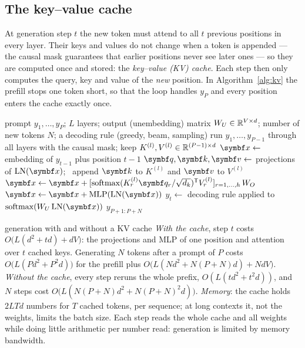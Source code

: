 \documentclass[11pt]{article}
\newcommand{\qv}{\vect{q}}
\newcommand{\kv}{\vect{k}}
\newcommand{\vv}{\vect{v}}
\newcommand{\softmax}{\operatorname{softmax}}
\newcommand{\LN}{\operatorname{LN}}
\newcommand{\MLP}{\operatorname{MLP}}
\begin{document}
\subsection{The key--value cache}\label{sec:kvcache}

At generation step $t$ the new token must attend to all $t$ previous positions in every layer. Their keys and values do not
change when a token is appended --- the causal mask guarantees that earlier positions never see later ones --- so they are
computed once and stored: the \emph{key--value (KV) cache}. Each step then only computes the query, key and value of the
\emph{new} position. In Algorithm~\ref{alg:kv} the prefill stops one token short, so that the loop handles $y_P$ and
every position enters the cache exactly once.

\begin{algorithm}[htbp]
\caption{Autoregressive generation with a key--value cache (decoder-only model)}\label{alg:kv}
\begin{algorithmic}[1]
\Require prompt $y_1, \dots, y_P$; $L$ layers; output (unembedding) matrix $W_U \in \mathbb{R}^{V \times d}$; number of new tokens
  $N$; a decoding rule (greedy, beam, sampling)
  \State run $y_1, \dots, y_{P-1}$ through all layers with the causal mask; keep $K^{(l)}, V^{(l)} \in \mathbb{R}^{(P-1) \times d}$
    \State $\x \gets$ embedding of $y_{t-1}$ plus position $t - 1$ 
      \State $\qv, \kv, \vv \gets$ projections of $\LN(\x)$; \ append $\kv$ to $K^{(l)}$ and $\vv$ to $V^{(l)}$ 
      \State $\x \gets \x + [\softmax(K^{(l)}_r\qv_r/\sqrt{d_k})\T V^{(l)}_r]_{r = 1, \dots, h}\,W_O$ 
      \State $\x \gets \x + \MLP(\LN(\x))$ 
    \EndFor
    \State $y_t \gets$ decoding rule applied to $\softmax(W_U\LN(\x))$ 
  \EndFor
  \State \Return $y_{P+1:P+N}$
\EndFunction
\end{algorithmic}
\end{algorithm}

\begin{runtime}{generation with and without a KV cache}
\emph{With the cache}, step $t$ costs $O\big(L(d^2 + td) + dV\big)$: the projections and MLP of one position and attention over
$t$ cached keys. Generating $N$ tokens after a prompt of $P$ costs $O\big(L(Pd^2 + P^2d)\big)$ for the prefill plus
$O\big(L(Nd^2 + N(P + N)d) + NdV\big)$. \emph{Without the cache}, every step reruns the whole prefix, $O(L(td^2 + t^2d))$,
and $N$ steps cost $O\big(L(N(P + N)d^2 + N(P + N)^2d)\big)$. \emph{Memory}: the cache holds $2LTd$ numbers
for $T$ cached tokens, per sequence; at long contexts it, not the weights, limits the batch size. Each step reads the
whole cache and all weights while doing little arithmetic per number read: generation is limited by memory bandwidth.
\end{runtime}
\end{document}
